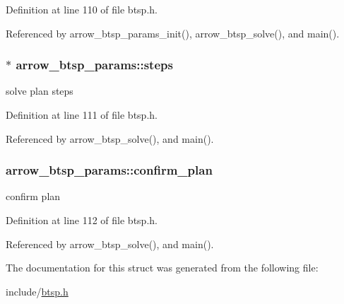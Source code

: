 Definition at line 110 of file btsp.h.

Referenced by arrow\_\-btsp\_\-params\_\-init(), arrow\_\-btsp\_\-solve(), and main().\hypertarget{structarrow__btsp__params_49aedb95b2fc4a725e3bb8485470484b}{
\subsubsection{$\ast$ {\bf arrow\_\-btsp\_\-params::steps}}}
\label{structarrow__btsp__params_49aedb95b2fc4a725e3bb8485470484b}


solve plan steps 

Definition at line 111 of file btsp.h.

Referenced by arrow\_\-btsp\_\-solve(), and main().\hypertarget{structarrow__btsp__params_f6a3bf7e56264d14b9dceb4ce779363c}{
\subsubsection{ {\bf arrow\_\-btsp\_\-params::confirm\_\-plan}}}
\label{structarrow__btsp__params_f6a3bf7e56264d14b9dceb4ce779363c}


confirm plan 

Definition at line 112 of file btsp.h.

Referenced by arrow\_\-btsp\_\-solve(), and main().

The documentation for this struct was generated from the following file:\begin{CompactItemize}
\item 
include/\hyperlink{btsp_8h}{btsp.h}\end{CompactItemize}
